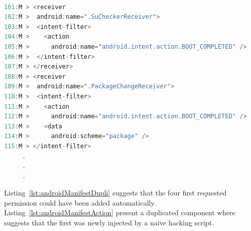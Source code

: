 \begin{lstlisting}[caption={An example of duplicated component capability from malicious version of app (com.koushikdutta.superuser)}, language=Java,
    basicstyle=\fontsize{6}{5}\selectfont\ttfamily,
    label={lst:androidManifestAction}]

101:M > <receiver
102:M >  android:name=".SuCheckerReceiver">
103:M >  <intent-filter>
104:M >    <action
105:M >      android:name="android.intent.action.BOOT_COMPLETED" />                 
106:M >  </intent-filter>
107:M > </receiver>
108:M > <receiver
109:M >  android:name=".PackageChangeReceiver">
110:M >  <intent-filter>
111:M >    <action
112:M >      android:name="android.intent.action.BOOT_COMPLETED" />
113:M >    <data
114:M >      android:scheme="package" />
115:M > </intent-filter>
     .
     .
     .
\end{lstlisting}

Listing~\ref{lst:androidManifestDupli} suggests that the four first requested permission could have been added automatically. Listing~\ref{lst:androidManifestAction} present a duplicated component where suggests that the first was newly injected by a naive hacking script.